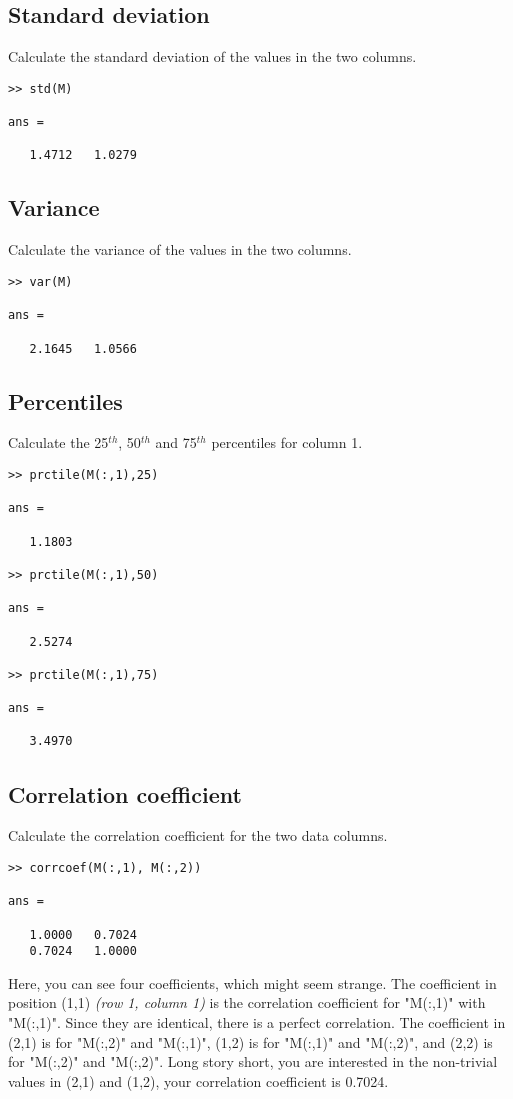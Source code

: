 \documentclass[12pt,a4paper]{article}
\begin{document}
\subsection{Standard deviation}
Calculate the standard deviation of the values in the two columns.
\begin{lstlisting}[style=Matlab-editor]
>> std(M)

ans =

   1.4712   1.0279
\end{lstlisting}

\subsection{Variance}
Calculate the variance of the values in the two columns.
\begin{lstlisting}[style=Matlab-editor]
>> var(M)

ans =

   2.1645   1.0566
\end{lstlisting}

\subsection{Percentiles}
Calculate the 25$^{th}$, 50$^{th}$ and 75$^{th}$ percentiles for column 1.
\begin{lstlisting}[style=Matlab-editor]
>> prctile(M(:,1),25)

ans =

   1.1803

>> prctile(M(:,1),50)

ans =

   2.5274

>> prctile(M(:,1),75)

ans =

   3.4970
\end{lstlisting}

\subsection{Correlation coefficient}
Calculate the correlation coefficient for the two data columns.
\begin{lstlisting}[style=Matlab-editor]
>> corrcoef(M(:,1), M(:,2))

ans =
   
   1.0000   0.7024
   0.7024   1.0000
\end{lstlisting}

Here, you can see four coefficients, which might seem strange. 
The coefficient in position (1,1) \emph{(row 1, column 1)} is the correlation coefficient for "M(:,1)" with "M(:,1)". Since they are identical, there is a perfect correlation. The coefficient in (2,1) is for "M(:,2)" and "M(:,1)", (1,2) is for "M(:,1)" and "M(:,2)", and (2,2) is for "M(:,2)" and "M(:,2)".
Long story short, you are interested in the non-trivial values in (2,1) and (1,2), your correlation coefficient is 0.7024.
\end{document}
